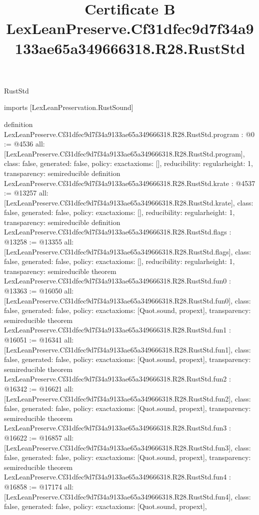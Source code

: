 \begin{lexlean}{RustStd}
\title{Certificate B LexLeanPreserve.Cf31dfec9d7f34a9133ae65a349666318.R28.RustStd}
\begin{coremodule}
imports [LexLeanPreservation.RustSound]

definition LexLeanPreserve.Cf31dfec9d7f34a9133ae65a349666318.R28.RustStd.program : @0 := @4536 {
  all: [LexLeanPreserve.Cf31dfec9d7f34a9133ae65a349666318.R28.RustStd.program],
  class: false,
  generated: false,
  policy: exact{axioms: []},
  reducibility: regular{height: 1},
  transparency: semireducible
}
definition LexLeanPreserve.Cf31dfec9d7f34a9133ae65a349666318.R28.RustStd.krate : @4537 := @13257 {
  all: [LexLeanPreserve.Cf31dfec9d7f34a9133ae65a349666318.R28.RustStd.krate],
  class: false,
  generated: false,
  policy: exact{axioms: []},
  reducibility: regular{height: 1},
  transparency: semireducible
}
definition LexLeanPreserve.Cf31dfec9d7f34a9133ae65a349666318.R28.RustStd.flags : @13258 := @13355 {
  all: [LexLeanPreserve.Cf31dfec9d7f34a9133ae65a349666318.R28.RustStd.flags],
  class: false,
  generated: false,
  policy: exact{axioms: []},
  reducibility: regular{height: 1},
  transparency: semireducible
}
theorem LexLeanPreserve.Cf31dfec9d7f34a9133ae65a349666318.R28.RustStd.fun0 : @13363 := @16050 {
  all: [LexLeanPreserve.Cf31dfec9d7f34a9133ae65a349666318.R28.RustStd.fun0],
  class: false,
  generated: false,
  policy: exact{axioms: [Quot.sound, propext]},
  transparency: semireducible
}
theorem LexLeanPreserve.Cf31dfec9d7f34a9133ae65a349666318.R28.RustStd.fun1 : @16051 := @16341 {
  all: [LexLeanPreserve.Cf31dfec9d7f34a9133ae65a349666318.R28.RustStd.fun1],
  class: false,
  generated: false,
  policy: exact{axioms: [Quot.sound, propext]},
  transparency: semireducible
}
theorem LexLeanPreserve.Cf31dfec9d7f34a9133ae65a349666318.R28.RustStd.fun2 : @16342 := @16621 {
  all: [LexLeanPreserve.Cf31dfec9d7f34a9133ae65a349666318.R28.RustStd.fun2],
  class: false,
  generated: false,
  policy: exact{axioms: [Quot.sound, propext]},
  transparency: semireducible
}
theorem LexLeanPreserve.Cf31dfec9d7f34a9133ae65a349666318.R28.RustStd.fun3 : @16622 := @16857 {
  all: [LexLeanPreserve.Cf31dfec9d7f34a9133ae65a349666318.R28.RustStd.fun3],
  class: false,
  generated: false,
  policy: exact{axioms: [Quot.sound, propext]},
  transparency: semireducible
}
theorem LexLeanPreserve.Cf31dfec9d7f34a9133ae65a349666318.R28.RustStd.fun4 : @16858 := @17174 {
  all: [LexLeanPreserve.Cf31dfec9d7f34a9133ae65a349666318.R28.RustStd.fun4],
  class: false,
  generated: false,
  policy: exact{axioms: [Quot.sound, propext]},
}
\end{coremodule}
\end{lexlean}
